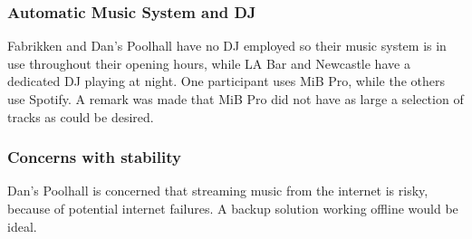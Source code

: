 \subsubsection{Automatic Music System and DJ}
\label{sub:differences}
Fabrikken and Dan's Poolhall have no DJ employed so their music system is in use throughout their opening hours, while LA Bar and Newcastle have a dedicated DJ playing at night. One participant uses MiB Pro, while the others use Spotify. A remark was made that MiB Pro did not have as large a selection of tracks as could be desired.

\subsubsection{Concerns with stability}
\label{sub:specific_remarks}

Dan's Poolhall is concerned that streaming music from the internet is risky, because of potential internet failures. A backup solution working offline would be ideal.









